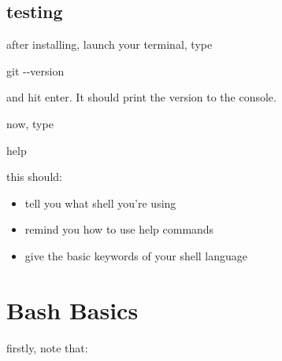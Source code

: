 \documentclass[
]{article}
\newenvironment{Shaded}{}{}
\newcommand{\AttributeTok}[1]{\textcolor[rgb]{0.49,0.56,0.16}{#1}}
\newcommand{\BuiltInTok}[1]{\textcolor[rgb]{0.00,0.50,0.00}{#1}}
\newcommand{\FunctionTok}[1]{\textcolor[rgb]{0.02,0.16,0.49}{#1}}
\providecommand{\tightlist}{%
  \setlength{\itemsep}{0pt}\setlength{\parskip}{0pt}}
\begin{document}
\hypertarget{testing}{%
\subsection{testing}\label{testing}}

after installing, launch your terminal, type

\begin{Shaded}
\begin{Highlighting}[]
\FunctionTok{git} \AttributeTok{{-}{-}version}
\end{Highlighting}
\end{Shaded}

and hit enter. It should print the version to the console.

now, type

\begin{Shaded}
\begin{Highlighting}[]
\BuiltInTok{help}
\end{Highlighting}
\end{Shaded}

this should:

\begin{itemize}
\tightlist
\item
  tell you what shell you're using
\item
  remind you how to use help commands
\item
  give the basic keywords of your shell language
\end{itemize}

\hypertarget{bash-basics}{%
\section{Bash Basics}\label{bash-basics}}

firstly, note that:
\end{document}
